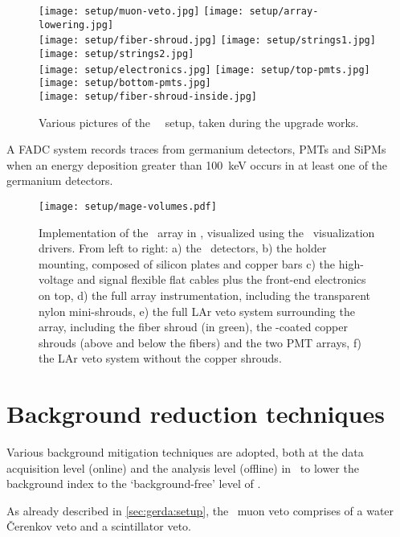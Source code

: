 \begin{figure}
  \texttt{[image: setup/muon-veto.jpg]}%
  \texttt{[image: setup/array-lowering.jpg]}\\%
  \texttt{[image: setup/fiber-shroud.jpg]}%
  \texttt{[image: setup/strings1.jpg]}%
  \texttt{[image: setup/strings2.jpg]}\\
  \texttt{[image: setup/electronics.jpg]}%
  \texttt{[image: setup/top-pmts.jpg]}%
  \texttt{[image: setup/bottom-pmts.jpg]}\\%
  \texttt{[image: setup/fiber-shroud-inside.jpg]}%
  \caption{%
    Various pictures of the \gerda\ \phasetwo\ setup, taken during the upgrade
    works.
  }\label{fig:setup:pictures}
\end{figure}

A FADC system records traces from germanium detectors, PMTs and SiPMs when an energy
deposition greater than 100~keV occurs in at least one of the germanium detectors.

\begin{figure}
  \centering
  \texttt{[image: setup/mage-volumes.pdf]}
  \caption{%
    Implementation of the \gerda\ array in \mage, visualized using the
    \geant\ visualization drivers. From left to right: a) the \gerda\
    detectors, b) the holder mounting, composed of silicon plates and
    copper bars c) the high-voltage and signal flexible flat cables plus
    the front-end electronics on top, d) the full array instrumentation,
    including the transparent nylon mini-shrouds, e) the full LAr veto
    system surrounding the array, including the fiber shroud (in green),
    the \tetratex-coated copper shrouds (above and below the fibers) and
    the two PMT arrays, f) the LAr veto system without the copper
    shrouds.%
  }\label{fig:setup:magevolumes}
\end{figure}

\section{Background reduction techniques}\label{sec:gerda:cuts}

Various background mitigation techniques are adopted, both at the data acquisition level
(online) and the analysis level (offline) in \gerda\ to lower the background index to the
`background-free' level of \pIIbi.

As already described in \cref{sec:gerda:setup}, the \gerda\ muon veto comprises of a water
\v{C}erenkov veto and a scintillator veto.

